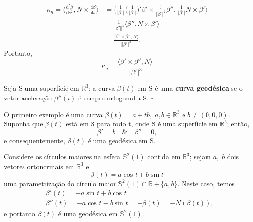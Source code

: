 \documentclass[../differential_geometry.tex]{subfiles}
\begin{document}
\begin{align*}
	\kappa_{g} = \biggl\langle \frac{\mathrm{d}^{2}\beta }{\mathrm{d}s^{2}}, N \times \frac{\mathrm{d}\beta }{\mathrm{d}s} \biggr\rangle & = \biggl\langle \frac{1}{\Vert \beta ' \Vert}\biggl(\frac{1}{\Vert \beta' \Vert}\biggr)'\beta '\times \frac{1}{\Vert \beta ' \Vert^{2}}\beta '', \frac{1}{\Vert \beta ' \Vert}N\times \beta'  \biggr\rangle \\
	                                                                                                                                     & =\frac{1}{\Vert \beta ' \Vert^{3}}\langle \beta '', N\times \beta ' \rangle                                                                                                                                 \\
	                                                                                                                                     & = \frac{\langle \beta '\times \beta '', N \rangle}{\Vert \beta' \Vert^{3}}.
\end{align*}
Portanto,
\[
	\boxed{\kappa_{g} = \frac{\langle \beta '\times \beta '', N \rangle}{\Vert \beta'  \Vert^{3}}}
\]
\begin{def*}
	Seja S uma superfície em \(\mathbb{R}^{3}\); a curva \(\beta (t)\) em S é uma \textbf{curva geodésica} se o vetor aceleração \(\beta ''(t)\) é sempre ortogonal a S. \(\square\)
\end{def*}
\begin{example}
	O primeiro exemplo é uma curva \(\beta (t) = a + tb,\; a, b\in \mathbb{R}^{3}\) e \(b\neq (0, 0, 0)\). Suponha que \(\beta (t)\) está em S para todo t, onde S é uma superfície em \(\mathbb{R}^{3}\); então,
	\[
		\beta '=b \quad\&\quad \beta ''=0,
	\]
	e consequentemente, \(\beta (t)\) é uma geodésica em S.
\end{example}
\begin{example}
	Considere os círculos maiores na esfera \(\mathbb{S}^{2}(1)\) contida em \(\mathbb{R}^{3}\); sejam \(a,\; b\) dois vetores ortonormais em \(\mathbb{R}^{3}\) e
	\[
		\beta (t) = a\cos^{}{t} + b\sin^{}{t}
	\]
	uma parametrização do círculo maior \(\mathbb{S}^{2}(1)\cap \mathbb{R}+\{a, b\}\). Neste caso, temos
	\begin{align*}
		 & \beta '(t) = -a\sin^{}{t} + b\cos^{}{t}                                \\
		 & \beta ''(t) = -a\cos^{}{t} - b\sin^{}{t} = -\beta (t) = -N(\beta (t)),
	\end{align*}
	e portanto \(\beta (t)\) é uma geodésica em \(\mathbb{S}^{2}(1)\).
\end{example}
\end{document}
